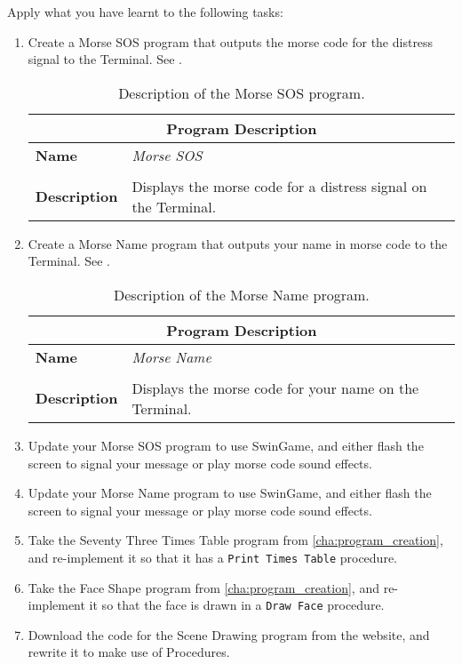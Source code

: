 \clearpage
Apply what you have learnt to the following tasks:
\begin{enumerate}
  \item Create a Morse SOS program that outputs the morse code for the distress signal to the Terminal. See .
  
  \begin{table}[h]
  \centering
  \begin{tabular}{l|p{10cm}}
    \hline
    \multicolumn{2}{c}{\textbf{Program Description}} \\
    \hline
    \textbf{Name} & \emph{Morse SOS} \\
    \\
    \textbf{Description} & Displays the morse code for a distress signal on the Terminal. \\
    \hline
  \end{tabular}
  \caption{Description of the Morse SOS program.}
  \label{tbl:procedure-decl-morse_sos}
  \end{table}
  
  \item Create a Morse Name program that outputs your name in morse code to the Terminal. See .
  
  \begin{table}[h]
  \centering
  \begin{tabular}{l|p{10cm}}
    \hline
    \multicolumn{2}{c}{\textbf{Program Description}} \\
    \hline
    \textbf{Name} & \emph{Morse Name} \\
    \\
    \textbf{Description} & Displays the morse code for your name on the Terminal. \\
    \hline
  \end{tabular}
  \caption{Description of the Morse Name program.}
  \label{tbl:procedure-decl-morse_name}
  \end{table}
  
  \item Update your Morse SOS program to use SwinGame, and either flash the screen to signal your message or play morse code sound effects.
  \item Update your Morse Name program to use SwinGame, and either flash the screen to signal your message or play morse code sound effects.
  
  \item Take the Seventy Three Times Table program from \cref{cha:program_creation}, and re-implement it so that it has a \texttt{Print Times Table} procedure.
  \item Take the Face Shape program from \cref{cha:program_creation}, and re-implement it so that the face is drawn in a \texttt{Draw Face} procedure.
  \item Download the code for the Scene Drawing program from the website, and rewrite it to make use of Procedures.
\end{enumerate}

